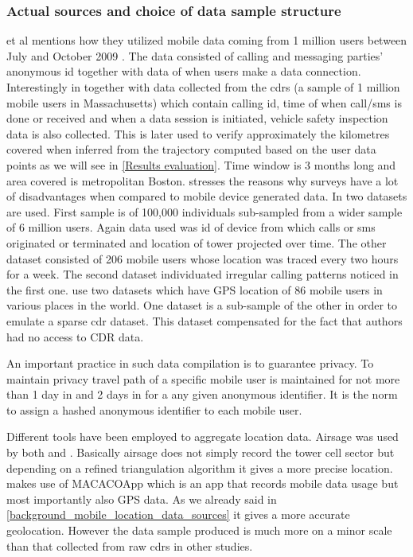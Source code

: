 \documentclass[12pt, a4paper]{report}
\theoremstyle{definition}
\theoremstyle{definition}%
\theoremstyle{definition}%
\theoremstyle{definition}%
\theoremstyle{definition}%
\theoremstyle{definition}%
\begin{document}
\subsubsection{Actual sources and choice of data sample structure} \label{methodoloy_sources}
\cite{Hoteit2014} et al mentions how they utilized mobile data coming from 1 million users between July and October 2009 \cite{Hoteit2014}. The data consisted of calling and messaging parties' anonymous id together with data of when users make a data connection. Interestingly in \cite{Calabrese2013} together with data collected from the cdrs (a sample of 1 million mobile users in Massachusetts) which contain calling id, time of when call/sms is done or received and when a data session is initiated, vehicle safety inspection data is also collected. This is later used to verify approximately the kilometres covered when inferred from the trajectory computed based on the user data points as we will see in \ref{Results evaluation}. Time window is 3 months long and area covered is metropolitan Boston.  \cite{Calabrese2013} stresses the reasons why surveys have a lot of disadvantages when compared to mobile device generated data. In \cite{Gonzalez2008} two datasets are used. First sample is of 100,000 individuals sub-sampled from a wider sample of 6 million users. Again data used was id of device from which calls or sms originated or terminated and location of tower projected over time. The other dataset consisted of 206 mobile users whose location was traced every two hours for a week. The second dataset individuated irregular calling patterns noticed in the first one. \cite{Hoteit2016} use two datasets which have GPS location of 86 mobile users in various places in the world. One dataset is a sub-sample of the other in order to emulate a sparse cdr dataset. This dataset compensated for the fact that authors had no access to CDR data.  

An important practice in such data compilation is to guarantee privacy. To maintain privacy travel path of a specific mobile user is maintained for not more than 1 day in \cite{Hoteit2014} and 2 days in \cite{Calabrese2013} for a any given anonymous identifier. It is the norm to assign a hashed anonymous identifier to each mobile user. 

Different tools have been employed to aggregate location data. Airsage was used by both \cite{Hoteit2014} and \cite{Calabrese2013}. Basically airsage does not simply record the tower cell sector but depending on a refined triangulation algorithm it gives a more precise location.  \cite{Hoteit2016} makes use of MACACOApp which is an app that records mobile data usage but most importantly also GPS data. As we already said in \ref{background_mobile_location_data_sources} it gives a more accurate geolocation. However the data sample produced is much more on a minor scale than that collected from raw cdrs in other studies.
\end{document}

